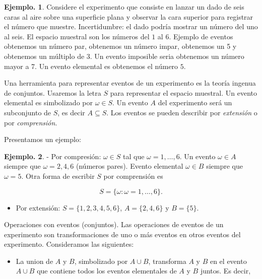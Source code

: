 \documentclass[]{book}
\providecommand{\tightlist}{%
  \setlength{\itemsep}{0pt}\setlength{\parskip}{0pt}}
\theoremstyle{definition}
\theoremstyle{definition}
\newtheorem{example}{Ejemplo.}[chapter]
\theoremstyle{definition}
\theoremstyle{remark}
\begin{document}
\begin{example}
\protect\hypertarget{exm:unnamed-chunk-87}{}{\label{exm:unnamed-chunk-87} }
Considere el experimento que consiste en lanzar un dado de seis caras al
aire sobre una superficie plana y observar la cara superior para registrar
el número que muestre. Incertidumbre: el dado podría mostrar un número del
uno al seis. El espacio muestral son los números del \(1\) al \(6\). Ejemplo
de eventos obtenemos un número par, obtenemos un número impar, obtenemos
un 5 y obtenemos un múltiplo de \(3\). Un evento imposible seria
obtenemos un número mayor a 7. Un evento elemental es obtenemos el número \(5\).
\end{example}

Una herramienta para representar eventos de un experimento es la teoría
ingenua de conjuntos. Usaremos la letra \(S\) para representar el espacio
muestral. Un evento elemental es simbolizado por \(\omega \in S\). Un evento
\(A\) del experimento será un subconjunto de \(S\), es decir \(A\subseteq S\).
Los eventos se pueden describir por \emph{extensión} o por \emph{comprensión}.

Presentamos un ejemplo:

\begin{example}
\protect\hypertarget{exm:unnamed-chunk-88}{}{\label{exm:unnamed-chunk-88} }
- Por compresión: \(\omega\in S\) tal que \(\omega=1,\ldots, 6\). Un evento
\(\omega \in A\) siempre que \(\omega=2,4,6\) (números pares). Evento elemental
\(\omega \in B\) siempre que \(\omega=5\). Otra forma de escribir \(S\) por comprensión es

\[S =\{\omega: \omega=1,\ldots,6 \} . \]

\begin{itemize}
\tightlist
\item
  Por extensión: \(S=\{1,2,3,4,5,6\}\), \(A= \{2, 4, 6 \}\) y \(B=\{5\}\).
\end{itemize}
\end{example}

Operaciones con eventos (conjuntos). Las operaciones de eventos de un
experimento son transformaciones de uno o más eventos en otros eventos del
experimento. Consideramos las siguientes:

\begin{itemize}
\tightlist
\item
  La union de \(A\) y \(B\), simbolizado por \(A\cup B\), transforma \(A\) y \(B\) en
  el evento \(A\cup B\) que contiene todos los eventos elementales de \(A\) y
  \(B\) juntos. Es decir,
\end{itemize}
\end{document}
